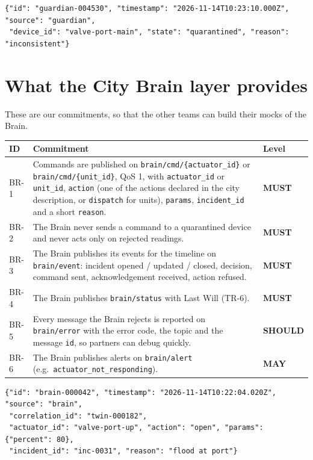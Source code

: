 \documentclass[11pt,a4paper]{article}
\newcommand{\code}[1]{\texttt{#1}}
\newcommand{\MUST}{\textbf{\textcolor{must}{MUST}}}
\newcommand{\SHOULD}{\textbf{\textcolor{should}{SHOULD}}}
\newcommand{\MAY}{\textbf{\textcolor{may}{MAY}}}
\begin{document}
\begin{lstlisting}[caption={Body of a quarantine notice}]
{"id": "guardian-004530", "timestamp": "2026-11-14T10:23:10.000Z", "source": "guardian",
 "device_id": "valve-port-main", "state": "quarantined", "reason": "inconsistent"}
\end{lstlisting}

\section{What the City Brain layer provides}

These are our commitments, so that the other teams can build their mocks of the Brain.

\begin{longtable}{@{}l p{10.9cm} l@{}}
\toprule
\textbf{ID} & \textbf{Commitment} & \textbf{Level} \\
\midrule
\endhead
BR-1 & Commands are published on \code{brain/\allowbreak cmd/\allowbreak \{actuator\_id\}} or \code{brain/\allowbreak cmd/\allowbreak \{unit\_id\}}, QoS 1, with \code{actuator\_id} or \code{unit\_id}, \code{action} (one of the actions declared in the city description, or \code{dispatch} for units), \code{params}, \code{incident\_id} and a short \code{reason}. & \MUST \\
BR-2 & The Brain never sends a command to a quarantined device and never acts only on rejected readings. & \MUST \\
BR-3 & The Brain publishes its events for the timeline on \code{brain/event}: incident opened / updated / closed, decision, command sent, acknowledgement received, action refused. & \MUST \\
BR-4 & The Brain publishes \code{brain/status} with Last Will (TR-6). & \MUST \\
BR-5 & Every message the Brain rejects is reported on \code{brain/error} with the error code, the topic and the message \code{id}, so partners can debug quickly. & \SHOULD \\
BR-6 & The Brain publishes alerts on \code{brain/alert} (e.g.\ \code{actuator\_not\_responding}). & \MAY \\
\bottomrule
\end{longtable}

\begin{lstlisting}[caption={Body of a command}]
{"id": "brain-000042", "timestamp": "2026-11-14T10:22:04.020Z", "source": "brain",
 "correlation_id": "twin-000182",
 "actuator_id": "valve-port-up", "action": "open", "params": {"percent": 80},
 "incident_id": "inc-0031", "reason": "flood at port"}
\end{lstlisting}
\end{document}
